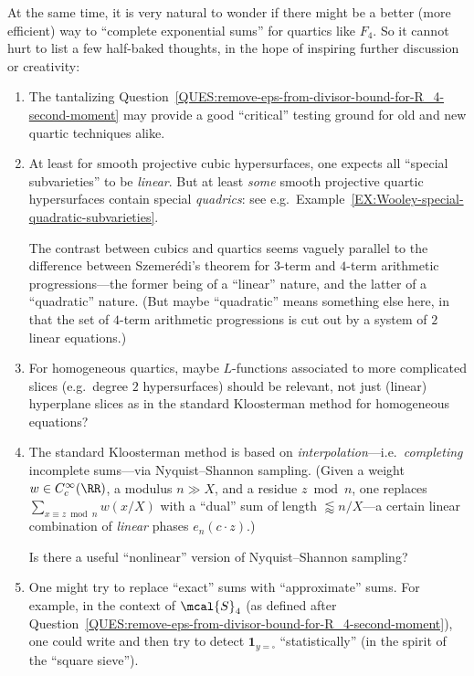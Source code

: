 \documentclass[12pt]{report}
\begin{document}
At the same time,
it is very natural to wonder if there might be a better (more
efficient) way to ``complete exponential sums'' for quartics like $F_4$.
So it cannot hurt to list a few half-baked thoughts,
in the hope of inspiring further discussion or creativity:
\begin{enumerate}[(1)]
    \item The tantalizing Question~\ref{QUES:remove-eps-from-divisor-bound-for-R_4-second-moment} may provide a good ``critical'' testing ground for old and new quartic techniques alike.
    
    \item At least for smooth projective cubic hypersurfaces,
    one expects all ``special subvarieties'' to be \emph{linear}.
    But at least \emph{some} smooth projective quartic hypersurfaces
    contain special \emph{quadrics}:
    see e.g.~Example~\ref{EX:Wooley-special-quadratic-subvarieties}.
    
    The contrast between cubics and quartics
    seems vaguely parallel to the
    difference between Szemer\'{e}di's theorem for $3$-term and $4$-term arithmetic progressions---the former being of a ``linear'' nature,
    and the latter of a ``quadratic'' nature.
    (But maybe ``quadratic'' means something else here,
    in that the set of $4$-term arithmetic progressions
    is cut out by a system of $2$ linear equations.)
    
    \item For homogeneous quartics,
    maybe $L$-functions associated to
    more complicated slices (e.g.~degree $2$ hypersurfaces)
    should be relevant,
    not just (linear) hyperplane slices as in the standard Kloosterman method for homogeneous equations?
    
    \item The standard Kloosterman method is based on \emph{interpolation}---i.e.~\emph{completing} incomplete sums---via
    Nyquist--Shannon sampling.
    (Given a weight $w\in C^\infty_c(\RR)$,
    a modulus $n\gg X$,
    and a residue $z\bmod{n}$,
    one replaces
    $\sum_{x\equiv z\bmod{n}}w(x/X)$
    with a ``dual'' sum of length $\lessapprox n/X$---a certain linear combination of \emph{linear} phases $e_n(c\cdot z)$.)
    
    Is there a useful ``nonlinear'' version of Nyquist--Shannon sampling?
    
    \item One might try to replace ``exact'' sums with ``approximate'' sums.
    For example,
    in the context of $\mcal{S}_4$
    (as defined after Question~\ref{QUES:remove-eps-from-divisor-bound-for-R_4-second-moment}),
    one could write
    and then try to detect $\bm{1}_{y=\square}$ ``statistically''
    (in the spirit of the ``square sieve'').
    

\end{enumerate}
\end{document}
